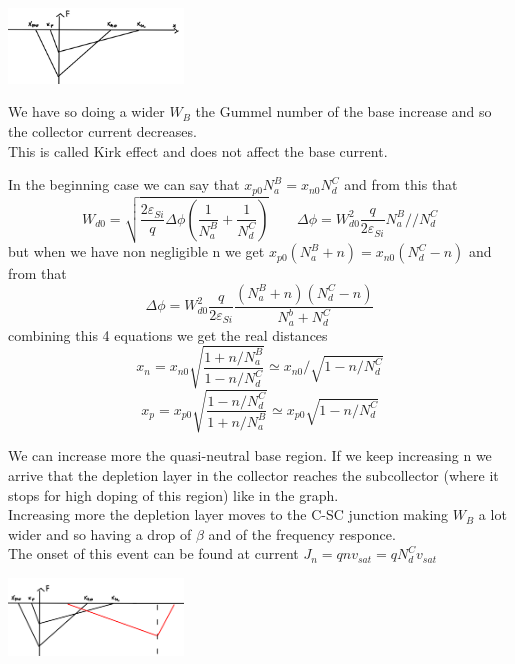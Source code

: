 \centering
\includegraphics[width=0.35\textwidth]{bjt10.png}\\
\raggedright

We have so doing a wider $W_B$ the Gummel number of the base increase and so the collector current decreases.\\
This is called Kirk effect and does not affect the base current.\\
\vspace{5mm}

In the beginning case we can say that $x_{p0}N_a^B=x_{n0}N_d^C$ and from this that 
\begin{equation}
W_{d0}=\sqrt{\frac{2\varepsilon_{Si}}{q}\Delta\phi(\frac{1}{N_a^B}+\frac{1}{N_d^C})} \ \ \ \ \ \ \ \ \ \Delta \phi=W_{d0}^2 \frac{q}{2\varepsilon_{Si}} N_a^B//N_d^C
\end{equation}
but when we have non negligible n we get $x_{p0}(N_a^B+n)=x_{n0}(N_d^C-n)$ and from that 
\begin{equation}
\Delta \phi=W_{d0}^2 \frac{q}{2\varepsilon_{Si}}\frac{(N_a^B+n)(N_d^C-n)}{N_a^b+N_d^C}
\end{equation}
combining this 4 equations we get the real distances 
\begin{equation}
x_n=x_{n0}\sqrt{\frac{1+n/N_a^B}{1-n/N_d^C}}\simeq x_{n0}/\sqrt{1-n/N_d^C}
\end{equation}
\begin{equation}
x_p=x_{p0}\sqrt{\frac{1-n/N_d^C}{1+n/N_a^B}}\simeq x_{p0}\sqrt{1-n/N_d^C}
\end{equation}

We can increase more the quasi-neutral base region. If we keep increasing n we arrive that the depletion layer in the collector reaches the subcollector (where it stops for high doping of this region) like in the graph.\\
Increasing more the depletion layer moves to the C-SC junction making $W_B$ a lot wider and so having a drop of $\beta$ and of the frequency responce.\\
The onset of this event can be found at current $J_n=qnv_{sat}=qN_d^C v_{sat}$

\centering
\includegraphics[width=0.35\textwidth]{bjt11.png}\\
\raggedright


